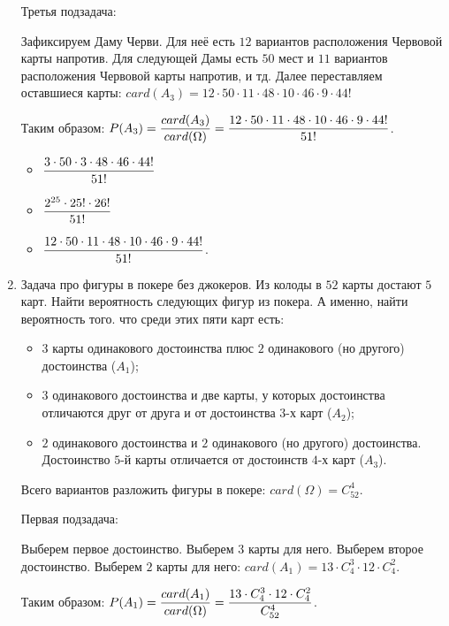 \documentclass{article}
\begin{document}
\begin{enumerate}
    Третья подзадача:

    Зафиксируем Даму Черви. Для неё есть $12$ вариантов расположения Червовой карты напротив. Для следующей Дамы есть $50$ мест и $11$ вариантов расположения Червовой карты напротив, и тд. Далее переставляем оставшиеся карты: $card(A_3) = 12 \cdot 50 \cdot 11 \cdot 48 \cdot 10 \cdot 46 \cdot 9 \cdot 44!$

    Таким образом: $\displaystyle{P(A_3) = \frac{card(A_3)}{card(\Omega)} = \frac{12 \cdot 50 \cdot 11 \cdot 48 \cdot 10 \cdot 46 \cdot 9 \cdot 44!}{51!}}$.

    \answer

    \begin{itemize}
        \item $\displaystyle{\frac{3 \cdot 50 \cdot 3 \cdot 48 \cdot 46 \cdot 44!}{51!}}$
        \item $\displaystyle{\frac{2^{25} \cdot 25! \cdot 26!}{51!}}$
        \item $\displaystyle{\frac{12 \cdot 50 \cdot 11 \cdot 48 \cdot 10 \cdot 46 \cdot 9 \cdot 44!}{51!}}$.
    \end{itemize}

    \item Задача про фигуры в покере без джокеров. Из колоды в $52$ карты достают $5$ карт. Найти вероятность следующих фигур из покера. А именно, найти вероятность того. что среди этих пяти карт есть:

    \begin{itemize}
        \item $3$ карты одинакового достоинства плюс $2$ одинакового (но другого) достоинства ($A_1$);
        \item $3$ одинакового достоинства и две карты, у которых достоинства отличаются друг от друга и от достоинства $3$-х карт ($A_2$);
        \item $2$ одинакового достоинства и $2$ одинакового (но другого) достоинства. Достоинство $5$-й карты отличается от достоинств $4$-х карт ($A_3$).
    \end{itemize}

    \solution{}

    Всего вариантов разложить фигуры в покере: $card(\Omega) = C_{52}^4$.

    Первая подзадача:

    Выберем первое достоинство. Выберем $3$ карты для него. Выберем второе достоинство. Выберем $2$ карты для него: $card(A_1) = 13 \cdot C_4^3 \cdot 12 \cdot C_4^2$.

    Таким образом: $\displaystyle{P(A_1) = \frac{card(A_1)}{card(\Omega)} = \frac{13 \cdot C_4^3 \cdot 12 \cdot C_4^2}{C_{52}^4}}$. 


\end{enumerate}
\end{document}

